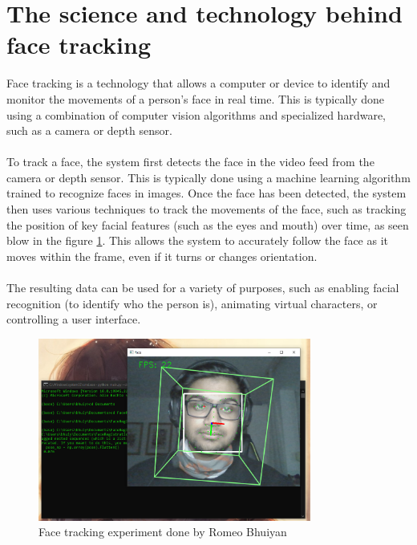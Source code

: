 \section{The science and technology behind face tracking}
Face tracking is a technology that allows a computer or device to identify
and monitor the movements of a person's face in real time. 
This is typically done using a combination of computer vision 
algorithms and specialized hardware, such as a camera or depth sensor. \cite{book2}
\\
\\
To track a face, the system first detects the face in 
the video feed from the camera or depth sensor. This is 
typically done using a machine learning algorithm trained to 
recognize faces in images. Once the face has been detected, 
the system then uses various techniques to track the movements 
of the face, such as tracking the position of key facial features
(such as the eyes and mouth) over time, as seen blow in the figure \ref{fig:facetracking}.
 This allows the system to accurately follow the face as it moves within the frame, even if it 
turns or changes orientation.
\\
\\
The resulting data can be used for a variety of 
purposes, such as enabling facial recognition 
(to identify who the person is), animating virtual characters, 
or controlling a user interface.
\\
\begin{figure}[htb]
    \centering
    \includegraphics[width=0.8\textwidth]{pics/bhuiyanfracetracking.png}
    \caption{Face tracking experiment done by Romeo Bhuiyan}
    \label{fig:facetracking}
\end{figure}


